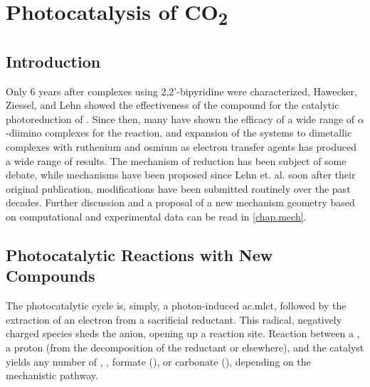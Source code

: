 \chapter{Photocatalysis of \texorpdfstring{CO\textsubscript{2}}{CO2}}

\section{Introduction}

Only 6 years after  complexes using 2,2'-bipyridine were characterized, Hawecker, Ziessel, and Lehn showed the effectiveness of the compound for the catalytic photoreduction of \autocite{hawecker1983}. Since then, many have shown the efficacy of a wide range of $\alpha$-diimino complexes for the reaction, and expansion of the systems to dimetallic complexes with ruthenium and osmium as electron transfer agents has produced a wide range of results. The mechanism of reduction has been subject of some debate, while mechanisms have been proposed since Lehn et. al. soon after their original publication\autocite{hawecker1986}, modifications have been submitted routinely over the past decades. Further discussion and a proposal of a new mechanism geometry based on computational and experimental data can be read in \autoref{chap.mech}.

\section{Photocatalytic Reactions with New Compounds}

The photocatalytic cycle is, simply, a photon-induced \gls{ac.mlct}, followed by the extraction of an electron from a sacrificial reductant. This radical, negatively charged species sheds the anion, opening up a reaction site. Reaction between a , a proton (from the decomposition of the reductant or elsewhere), and the catalyst yields any number of , , formate (), or carbonate (), depending on the mechanistic pathway. 

